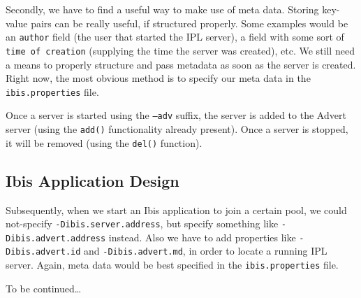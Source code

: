 Secondly, we have to find a useful way to make use of meta data. Storing
key-value pairs can be really useful, if structured properly. Some examples
would be an \texttt{author} field (the user that started the IPL server), a
field with some sort of \texttt{time of creation} (supplying the time the
server was created), etc. We still need a means to properly structure
and pass metadata as soon as the server is created. Right now, the most obvious
method is to specify our meta data in the \texttt{ibis.properties} file.

Once a server is started using the \texttt{--adv} suffix, the server is added
to the Advert server (using the \texttt{add()} functionality already present).
Once a server is stopped, it will be removed (using the \texttt{del()}
function).

\subsection{Ibis Application Design}
Subsequently, when we start an Ibis application to join a certain pool, we
could not-specify \texttt{-Dibis.server.address}, but specify something like
\texttt{-Dibis.advert.address} instead. Also we have to add properties
like \texttt{-Dibis.advert.id} and \texttt{-Dibis.advert.md}, in order to
locate a running IPL server. Again, meta data would be best specified in the 
\texttt{ibis.properties} file.

To be continued\ldots

